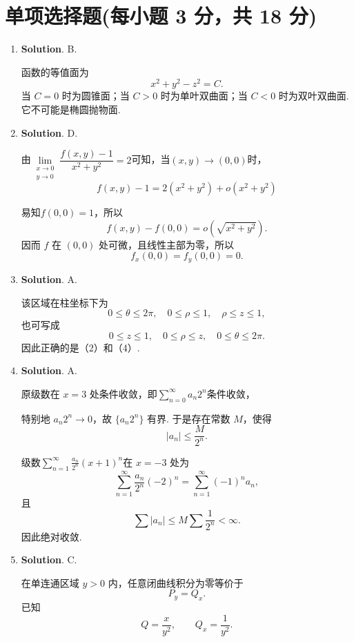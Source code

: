 \documentclass[../Main.tex]{subfiles}
\begin{document}
\section{单项选择题(每小题 3 分，共 18 分)}
\begin{enumerate}
  \item \textbf{Solution}. B.

        函数的等值面为
        \[
          x^2+y^2-z^2=C.
        \]
        当 \(C=0\) 时为圆锥面；当 \(C>0\) 时为单叶双曲面；当 \(C<0\) 时为双叶双曲面. 它不可能是椭圆抛物面.

  \item \textbf{Solution}. D.

        由$\lim\limits_{\substack{x \to 0 \\ y \to 0}}\dfrac{f(x,y)-1}{x^2+y^2}=2$可知，当$(x,y)\to(0,0)$时，
        \[
          f(x,y)-1=2(x^2+y^2)+o(x^2+y^2)
        \]

        易知$f(0,0)=1$，所以
        \[
          f(x,y)-f(0,0)=o\left(\sqrt{x^2+y^2}\right).
        \]
        因而 \(f\) 在 \((0,0)\) 处可微，且线性主部为零，所以
        \[
          f_x(0,0)=f_y(0,0)=0.
        \]

  \item \textbf{Solution}. A.

        该区域在柱坐标下为
        \[
          0\le \theta\le 2\pi,\quad 0\le \rho\le 1,\quad \rho\le z\le 1,
        \]
        也可写成
        \[
          0\le z\le 1,\quad 0\le \rho\le z,\quad 0\le \theta\le 2\pi.
        \]
        因此正确的是（2）和（4）.

  \item \textbf{Solution}. A.

        原级数在 \(x=3\) 处条件收敛，即$\sum_{n=0}^{\infty}a_n2^n$条件收敛，

        特别地 \(a_n2^n\to0\)，故 \(\{a_n2^n\}\) 有界. 于是存在常数 \(M\)，使得
        \[
          |a_n|\le \frac{M}{2^n}.
        \]

        级数$\sum_{n=1}^{\infty}\frac{a_n}{2^n}(x+1)^n$在 \(x=-3\) 处为
        \[
          \sum_{n=1}^{\infty}\frac{a_n}{2^n}(-2)^n=\sum_{n=1}^{\infty}(-1)^n a_n,
        \]
        且
        \[
          \sum |a_n|\le M\sum\frac1{2^n}<\infty.
        \]
        因此绝对收敛.

  \item \textbf{Solution}. C.

        在单连通区域 \(y>0\) 内，任意闭曲线积分为零等价于
        \[
          P_y=Q_x.
        \]
        已知
        \[
          Q=\frac{x}{y^2},\qquad Q_x=\frac{1}{y^2}.
        \]


\end{enumerate}
\end{document}
